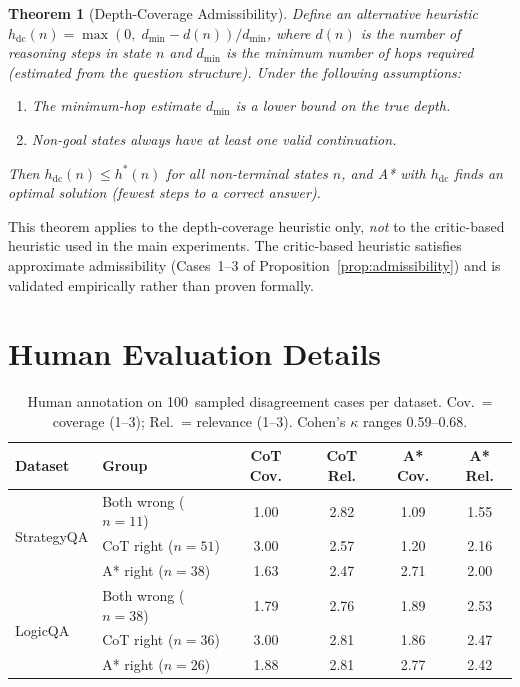 \documentclass{article}
\newtheorem{theorem}{Theorem}
\begin{document}
\begin{theorem}[Depth-Coverage Admissibility]
\label{thm:depth_coverage}
Define an alternative heuristic
$h_{\mathrm{dc}}(n) = \max(0,\; d_{\min} - d(n)) / d_{\min}$,
where $d(n)$ is the number of reasoning steps in state $n$ and $d_{\min}$ is
the minimum number of hops required (estimated from the question structure).
Under the following assumptions:
\begin{enumerate}[label=A\arabic*,leftmargin=2.5em]
\item The minimum-hop estimate $d_{\min}$ is a lower bound on the true depth.
\item Non-goal states always have at least one valid continuation.
\end{enumerate}
Then $h_{\mathrm{dc}}(n) \leq h^*(n)$ for all non-terminal states $n$, and
A* with $h_{\mathrm{dc}}$ finds an optimal solution (fewest steps to a correct
answer).
\end{theorem}

This theorem applies to the depth-coverage heuristic only, \emph{not} to
the critic-based heuristic used in the main experiments.  The critic-based
heuristic satisfies approximate admissibility (Cases~1--3 of
Proposition~\ref{prop:admissibility}) and is validated empirically rather than
proven formally.

\section{Human Evaluation Details}
\label{app:human}

\begin{table}[h]
\centering
\caption{Human annotation on 100~sampled disagreement cases per dataset.
Cov.\ = coverage (1--3); Rel.\ = relevance (1--3).  Cohen's $\kappa$ ranges
0.59--0.68.}
\label{tab:human}
\small
\begin{tabular}{@{}llcccc@{}}
\toprule
\textbf{Dataset} & \textbf{Group} & \textbf{CoT Cov.} & \textbf{CoT Rel.}
  & \textbf{A* Cov.} & \textbf{A* Rel.} \\
\midrule
\multirow{3}{*}{StrategyQA}
  & Both wrong ($n{=}11$) & 1.00 & 2.82 & 1.09 & 1.55 \\
  & CoT right ($n{=}51$) & 3.00 & 2.57 & 1.20 & 2.16 \\
  & A* right ($n{=}38$)  & 1.63 & 2.47 & 2.71 & 2.00 \\
\midrule
\multirow{3}{*}{LogicQA}
  & Both wrong ($n{=}38$) & 1.79 & 2.76 & 1.89 & 2.53 \\
  & CoT right ($n{=}36$)  & 3.00 & 2.81 & 1.86 & 2.47 \\
  & A* right ($n{=}26$)   & 1.88 & 2.81 & 2.77 & 2.42 \\
\bottomrule
\end{tabular}
\end{table}
\end{document}
